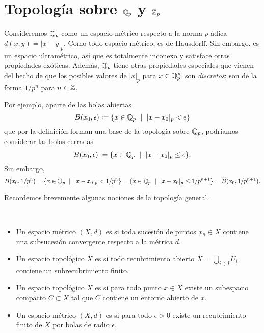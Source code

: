 \documentclass{article}
\numberwithin{equation}{section}
\theoremstyle{definition}
\begin{document}
\section{Topología sobre $\mathbb{Q}_p$ y $\mathbb{Z}_p$}

Consideremos $\mathbb{Q}_p$ como un espacio métrico respecto a la norma $p$-ádica
$d (x,y) = |x-y|_p$. Como todo espacio métrico, es de Hausdorff. Sin embargo,
es un espacio ultramétrico, así que es totalmente inconexo y satisface otras
propiedades exóticas. Además, $\mathbb{Q}_p$ tiene otras propiedades especiales que
vienen del hecho de que los posibles valores de $|x|_p$ para $x\in\mathbb{Q}_p^\times$
son \emph{discretos}: son de la forma $1/p^n$ para $n\in \mathbb{Z}$.

Por ejemplo, aparte de las bolas abiertas
$$B (x_0,\epsilon) \mathrel{\mathop:}= \{ x \in \mathbb{Q}_p ~\mid~ |x-x_0|_p < \epsilon \}$$
que por la definición forman una base de la topología sobre $\mathbb{Q}_p$, podríamos
considerar las bolas cerradas
\[ \overline{B} (x_0,\epsilon) \mathrel{\mathop:}=
   \{ x \in \mathbb{Q}_p ~\mid~ |x-x_0|_p \le \epsilon \}. \]
Sin embargo,
\[ B (x_0,1/p^n) =
   \{ x \in \mathbb{Q}_p ~\mid~ |x-x_0|_p < 1/p^n \} =
   \{ x \in \mathbb{Q}_p ~\mid~ |x-x_0|_p \le 1/p^{n+1} \} =
   \overline{B} (x_0,1/p^{n+1}). \]

Recordemos brevemente algunas nociones de la topología general.

\begin{definicion}
  ~

  \begin{itemize}
  \item Un espacio métrico $(X,d)$ es  si toda
    sucesión de puntos $x_n \in X$ contiene una subsucesión convergente respecto
    a la métrica $d$.

  \item Un espacio topológico $X$ es  si todo recubrimiento
    abierto $X = \bigcup_{i\in I} U_i$ contiene un subrecubrimiento finito.

  \item Un espacio topológico $X$ es  si para todo
    punto $x\in X$ existe un subespacio compacto $C \subset X$ tal que $C$
    contiene un entorno abierto de $x$.

  \item Un espacio métrico $(X,d)$ es  si para todo
    $\epsilon > 0$ existe un recubrimiento finito de $X$ por bolas de radio
    $\epsilon$.
  \end{itemize}
\end{definicion}
\end{document}
